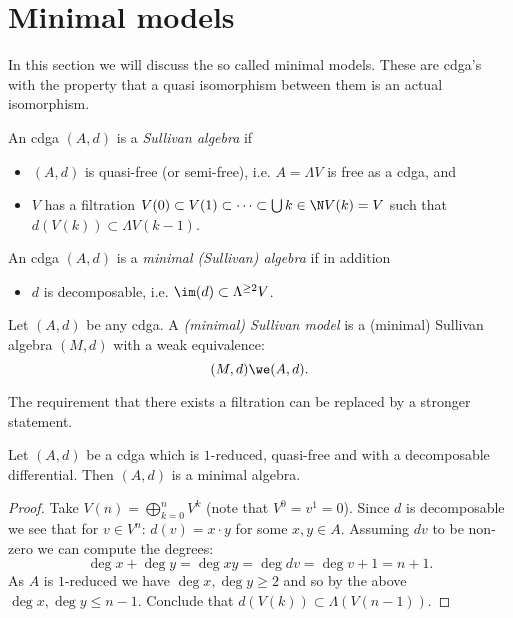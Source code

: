 
\section{Minimal models}

In this section we will discuss the so called minimal models. These are cdga's with the property that a quasi isomorphism between them is an actual isomorphism.

\begin{definition}
	An cdga $(A, d)$ is a \emph{Sullivan algebra} if
	\begin{itemize}
		\item $(A, d)$ is quasi-free (or semi-free), i.e. $A = \Lambda V$ is free as a cdga, and
		\item $V$ has a filtration $V(0) \subset V(1) \subset \cdots \subset \bigcup{k \in \N} V(k) = V$ such that $d(V(k)) \subset \Lambda V(k-1)$.
	\end{itemize}

	An cdga $(A, d)$ is a \emph{minimal (Sullivan) algebra} if in addition
	\begin{itemize}
		\item $d$ is decomposable, i.e. $\im(d) \subset \Lambda^{\geq 2}V$.
	\end{itemize}
\end{definition}

\begin{definition}
	Let $(A, d)$ be any cdga. A \emph{(minimal) Sullivan model} is a (minimal) Sullivan algebra $(M, d)$ with a weak equivalence:
	$$ (M, d) \we (A, d). $$
\end{definition}

The requirement that there exists a filtration can be replaced by a stronger statement.

\begin{lemma}
	Let $(A, d)$ be a cdga which is $1$-reduced, quasi-free and with a decomposable differential. Then $(A, d)$ is a minimal algebra.
\end{lemma}
\begin{proof}
	Take $V(n) = \bigoplus_{k=0}^n V^k$ (note that $V^0 = v^1 = 0$). Since $d$ is decomposable we see that for $v \in V^n$: $d(v) = x \cdot y$ for some $x, y \in A$. Assuming $dv$ to be non-zero we can compute the degrees:
	$$ \deg{x} + \deg{y} = \deg{xy} = \deg{dv} = \deg{v} + 1 = n + 1. $$
	As $A$ is $1$-reduced we have $\deg{x}, \deg{y} \geq 2$ and so by the above $\deg{x}, \deg{y} \leq n-1$. Conclude that $d(V(k)) \subset \Lambda(V(n-1))$.
\end{proof}


